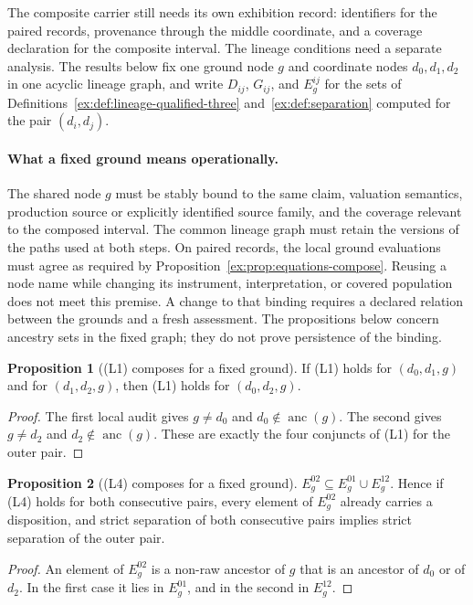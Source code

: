 \documentclass[11pt]{article}
\theoremstyle{definition}
\newtheorem{proposition}{Proposition}[section]
\begin{document}
The composite carrier still needs its own exhibition record: identifiers for the paired records, provenance through the middle coordinate, and a coverage declaration for the composite interval. The lineage conditions need a separate analysis. The results below fix one ground node $g$ and coordinate nodes $d_0,d_1,d_2$ in one acyclic lineage graph, and write $D_{ij}$, $G_{ij}$, and $E^{ij}_g$ for the sets of Definitions~\ref{ex:def:lineage-qualified-three} and~\ref{ex:def:separation} computed for the pair $(d_i,d_j)$.

\paragraph{What a fixed ground means operationally.}
The shared node $g$ must be stably bound to the same claim, valuation semantics, production source or explicitly identified source family, and the coverage relevant to the composed interval. The common lineage graph must retain the versions of the paths used at both steps. On paired records, the local ground evaluations must agree as required by Proposition~\ref{ex:prop:equations-compose}. Reusing a node name while changing its instrument, interpretation, or covered population does not meet this premise. A change to that binding requires a declared relation between the grounds and a fresh assessment. The propositions below concern ancestry sets in the fixed graph; they do not prove persistence of the binding.

\begin{proposition}[(L1) composes for a fixed ground]\label{ex:prop:l1-compose}
If (L1) holds for $(d_0,d_1,g)$ and for $(d_1,d_2,g)$, then (L1) holds for $(d_0,d_2,g)$.
\end{proposition}
\begin{proof}
The first local audit gives $g\neq d_0$ and $d_0\notin\operatorname{anc}(g)$. The second gives $g\neq d_2$ and $d_2\notin\operatorname{anc}(g)$. These are exactly the four conjuncts of (L1) for the outer pair.
\end{proof}

\begin{proposition}[(L4) composes for a fixed ground]\label{ex:prop:l4-compose}
$E^{02}_g\subseteq E^{01}_g\cup E^{12}_g$. Hence if (L4) holds for both consecutive pairs, every element of $E^{02}_g$ already carries a disposition, and strict separation of both consecutive pairs implies strict separation of the outer pair.
\end{proposition}
\begin{proof}
An element of $E^{02}_g$ is a non-raw ancestor of $g$ that is an ancestor of $d_0$ or of $d_2$. In the first case it lies in $E^{01}_g$, and in the second in $E^{12}_g$.
\end{proof}
\end{document}
